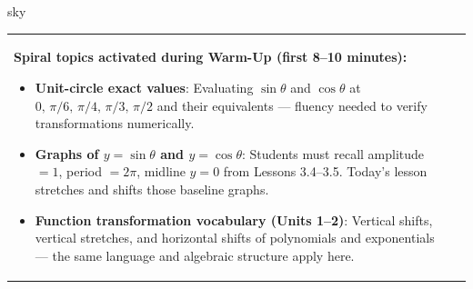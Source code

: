 \documentclass[10pt]{article}
\begin{document}
\begin{skillbox}{sky}
\begin{tabularx}{\linewidth}{@{}X c@{}}
\begin{minipage}[t]{0.96\linewidth}\vspace{0pt}
\textbf{Spiral topics activated during Warm-Up (first 8--10 minutes):}
\begin{itemize}[leftmargin=1.4em, itemsep=2pt]
  \item \textbf{Unit-circle exact values}: Evaluating $\sin\theta$ and
    $\cos\theta$ at $0,\,\pi/6,\,\pi/4,\,\pi/3,\,\pi/2$ and their
    equivalents --- fluency needed to verify transformations numerically.
  \item \textbf{Graphs of $y=\sin\theta$ and $y=\cos\theta$}: Students
    must recall amplitude $= 1$, period $= 2\pi$, midline $y = 0$ from
    Lessons 3.4--3.5. Today's lesson stretches and shifts those baseline graphs.
  \item \textbf{Function transformation vocabulary (Units 1--2)}: Vertical
    shifts, vertical stretches, and horizontal shifts of polynomials and
    exponentials --- the same language and algebraic structure apply here.
\end{itemize}
\end{minipage}
&
\end{tabularx}
\end{skillbox}

\vspace{0.08in}
\end{document}
